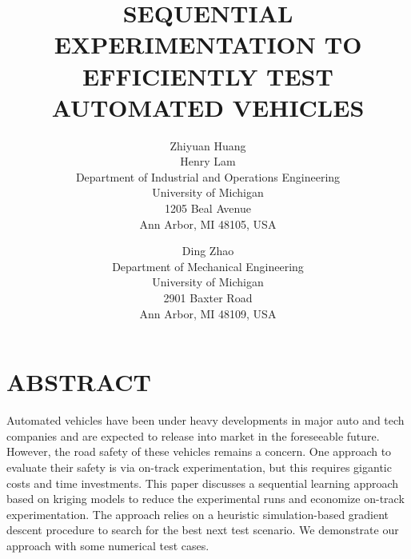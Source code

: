 \documentclass{wscpaperproc}
\theoremstyle{wsc}
\begin{document}
%
%

\title{SEQUENTIAL EXPERIMENTATION TO EFFICIENTLY TEST AUTOMATED VEHICLES}

\author{Zhiyuan Huang\\ Henry Lam\\ [12pt]
Department of Industrial and Operations Engineering \\
University of Michigan\\
1205 Beal Avenue\\
Ann Arbor, MI 48105, USA\\
\and
Ding Zhao\\[12pt]
Department of Mechanical Engineering\\
University of Michigan\\
2901 Baxter Road\\
Ann Arbor, MI 48109, USA
}






\maketitle

\section*{ABSTRACT}
Automated vehicles have been under heavy developments in major auto and tech companies and are expected to release into market in the foreseeable future. However, the road safety of these vehicles remains a concern. One approach to evaluate their safety is via on-track experimentation, but this requires gigantic costs and time investments. This paper discusses a sequential learning approach based on kriging models to reduce the experimental runs and economize on-track experimentation. The approach relies on a heuristic simulation-based gradient descent procedure to search for the best next test scenario. We demonstrate our approach with some numerical test cases.
\end{document}
